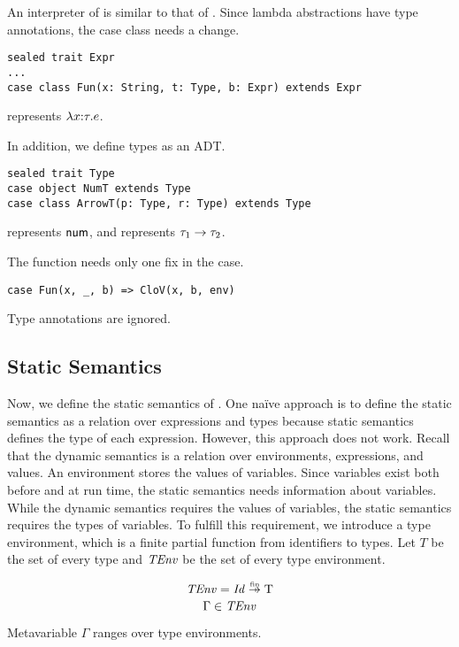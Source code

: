 An interpreter of \plang is similar to that of \plang. Since lambda abstractions
have type annotations, the  case class needs a change.

\begin{verbatim}
sealed trait Expr
...
case class Fun(x: String, t: Type, b: Expr) extends Expr
\end{verbatim}

 represents $\lambda x{:}\tau.e$.

In addition, we define types as an ADT.

\begin{verbatim}
sealed trait Type
case object NumT extends Type
case class ArrowT(p: Type, r: Type) extends Type
\end{verbatim}

 represents $\textsf{num}$, and  represents
$\tau_1\rightarrow\tau_2$.

The  function needs only one fix in the  case.

\begin{verbatim}
case Fun(x, _, b) => CloV(x, b, env)
\end{verbatim}

Type annotations are ignored.

\subsection{Static Semantics}

Now, we define the static semantics of \lang. One naïve approach is to define
the static semantics as a relation over expressions and types because static
semantics defines the type of each expression. However, this approach does not
work. Recall that the dynamic semantics is a
relation over environments, expressions, and values. An environment stores the
values of variables. Since variables exist both before and at run time, the static
semantics needs information about variables. While the dynamic semantics requires the
values of variables, the static semantics requires the types of variables.
To fulfill this requirement,
we introduce a type environment, which is a finite partial function from identifiers to types.
Let $T$ be the set of every type and $\mbox{\emph{TEnv}}$ be the set of every type
environment.

\[ \embox{TEnv} = \embox{Id}\finto\text{T} \]
\[ \Gamma \in \mbox{\emph{TEnv}} \]

Metavariable $\Gamma$ ranges over type environments.

